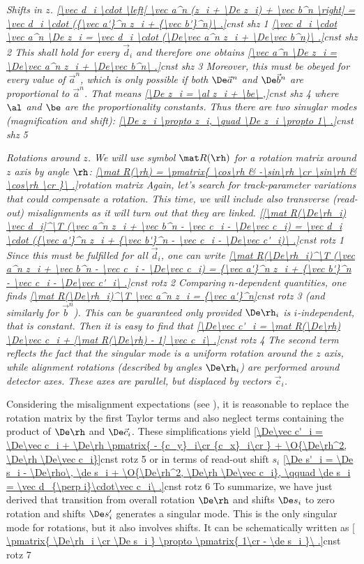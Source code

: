 \em{Shifts in $z$}. 
\eqref{\vec d_i \cdot \left[ \vec a^n (z_i + \De z_i) + \vec b^n \right] = \vec d_i \cdot ({\vec a'}^n z_i + {\vec b'}^n)\ .}{cnst shz 1}
\eqref{\vec d_i \cdot \vec a^n \De z_i = \vec d_i \cdot (\De\vec a^n z_i + \De\vec b^n)\ .}{cnst shz 2}
This shall hold for every $\vec d_i$ and therefore one obtains
\eqref{\vec a^n \De z_i = \De\vec a^n z_i + \De\vec b^n\ .}{cnst shz 3}
Moreover, this must be obeyed for every value of $\vec a^n$, which is only possible if both $\De\vec a^n$ and $\De\vec b^n$ are proportional to $\vec a^n$. That means
\eqref{\De z_i = \al z_i + \be\ ,}{cnst shz 4}
where $\al$ and $\be$ are the proportionality constants. Thus there are two sinuglar modes (magnification and shift):
\eqref{\De z_i \propto z_i, \quad \De z_i \propto 1\ .}{cnst shz 5}

\em{Rotations around $z$}. We will use symbol $\mat R(\rh)$ for a rotation matrix around $z$ axis by angle $\rh$:
\eqref{\mat R(\rh) = \pmatrix{
\cos\rh & -\sin\rh \cr
\sin\rh & \cos\rh \cr
}\ .}{rotation matrix}
Again, let's search for track-parameter variations that could compensate a rotation. This time, we will include also transverse (read-out) misalignments as it will turn out that they are linked.
\eqref{[\mat R(\De\rh_i) \vec d_i]^\T (\vec a^n z_i + \vec b^n - \vec c_i - \De\vec c_i) = \vec d_i \cdot ({\vec a'}^n z_i + {\vec b'}^n - \vec c_i - \De\vec c'_i)\ .}{cnst rotz 1}
Since this must be fulfilled for all $\vec d_i$, one can write
\eqref{\mat R(\De\rh_i)^\T (\vec a^n z_i + \vec b^n - \vec c_i - \De\vec c_i) = {\vec a'}^n z_i + {\vec b'}^n - \vec c_i - \De\vec c'_i\ .}{cnst rotz 2}
Comparing $n$-dependent quantities, one finds
\eqref{\mat R(\De\rh_i)^\T \vec a^n z_i = {\vec a'}^n}{cnst rotz 3}
(and similarly for $\vec b^n$). This can be guaranteed only provided $\De\rh_i$ is $i$-independent, that is constant. Then it is easy to find that
\eqref{\De\vec c'_i = \mat R(\De\rh) \De\vec c_i + [\mat R(\De\rh) - 1] \vec c_i\ .}{cnst rotz 4}
The second term reflects the fact that the singular mode is a uniform rotation around the $z$ axis, while alignment rotations (described by angles $\De\rh_i$) are performed around detector axes. These axes are parallel, but displaced by vectors $\vec c_i$.

Considering the misalignment expectations (see ), it is reasonable to replace the rotation matrix by the first Taylor terms and also neglect terms containing the product of $\De\rh$ and $\De\vec c_i$. These simplifications yield
\eqref{\De\vec c'_i = \De\vec c_i + \De\rh \pmatrix{
- {c_y}_i\cr
{c_x}_i\cr
} + \O{\De\rh^2, \De\rh \De\vec c_i}}{cnst rotz 5}
or in terms of read-out shift $s_i$
\eqref{\De s'_i = \De s_i - \De\rho\, \de s_i + \O{\De\rh^2, \De\rh \De\vec c_i}, \qquad \de s_i = \vec d_{\perp i}\cdot\vec c_i\ .}{cnst rotz 6}
To summarize, we have just derived that transition from overall rotation $\De\rh$ and shifts $\De s_i$ to zero rotation and shifts $\De s_i'$ generates a singular mode. This is the only singular mode for rotations, but it also involves shifts. It can be schematically written as
\eqref{
\pmatrix{
\De\rh_i \cr
\De s_i
} \propto \pmatrix{
1\cr
- \de s_i
}\ .}{cnst rotz 7}


